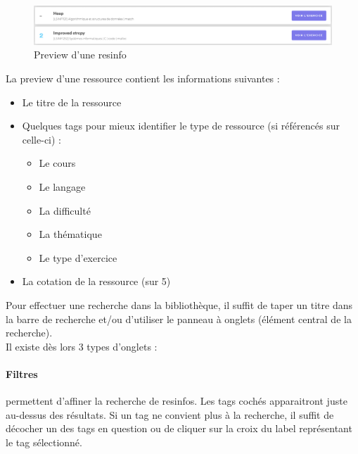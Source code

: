 \begin{figure}[H]
    \includegraphics[width=\textwidth,height=\textheight,keepaspectratio]{images/client/preview-exercise.png}
    \centering
    \caption[SourceCode : preview d'une \gls{resinfo}]{Preview d'une \gls{resinfo}}
\end{figure}

La preview d'une ressource contient les informations suivantes :

\begin{itemize}
    \item Le titre de la ressource
    \item Quelques \glspl{tag} pour mieux identifier le type de ressource (si référencés sur celle-ci) : 
    \begin{itemize}
        \item Le cours
        \item Le langage
        \item La difficulté
        \item La thématique
        \item Le type d'exercice
    \end{itemize}
    \item La cotation de la ressource (sur 5)
\end{itemize}

\label{section:panneau}

Pour effectuer une recherche dans la bibliothèque, il suffit de taper un titre dans la barre de recherche et/ou d'utiliser le panneau à onglets (élément central de la recherche).\\

Il existe dès lors 3 types d'onglets :

\paragraph{Filtres} permettent d'affiner la recherche de \glspl{resinfo}. Les \glspl{tag} cochés apparaitront juste au-dessus des résultats. Si un \gls{tag} ne convient plus à la recherche, il suffit de décocher un des tags en question ou de cliquer sur la croix du label représentant le \gls{tag} sélectionné.\\

